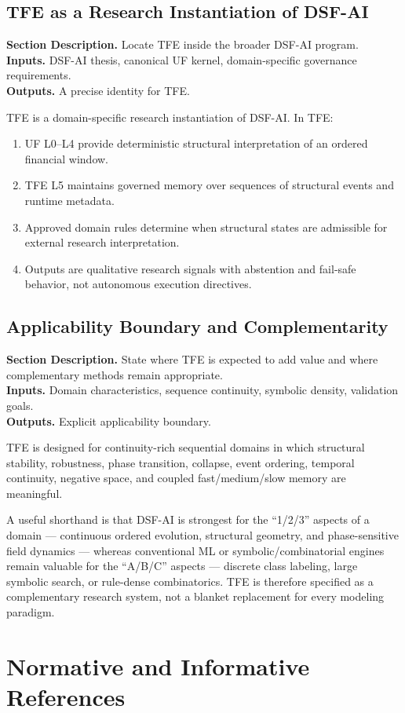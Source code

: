 \documentclass[11pt]{report}
\newcommand{\meta}[3]{\textbf{Section Description.} #1\\
\textbf{Inputs.} #2\\
\textbf{Outputs.} #3\par}
\begin{document}
\section{TFE as a Research Instantiation of DSF-AI}
\meta{Locate TFE inside the broader DSF-AI program.}{DSF-AI thesis, canonical UF kernel, domain-specific governance requirements.}{A precise identity for TFE.}

TFE is a domain-specific research instantiation of DSF-AI. In TFE:
\begin{enumerate}[leftmargin=1.2cm]
    \item UF L0--L4 provide deterministic structural interpretation of an ordered financial window.
    \item TFE L5 maintains governed memory over sequences of structural events and runtime metadata.
    \item Approved domain rules determine when structural states are admissible for external research interpretation.
    \item Outputs are qualitative research signals with abstention and fail-safe behavior, not autonomous execution directives.
\end{enumerate}

\section{Applicability Boundary and Complementarity}
\meta{State where TFE is expected to add value and where complementary methods remain appropriate.}{Domain characteristics, sequence continuity, symbolic density, validation goals.}{Explicit applicability boundary.}

TFE is designed for continuity-rich sequential domains in which structural stability, robustness, phase transition, collapse, event ordering, temporal continuity, negative space, and coupled fast/medium/slow memory are meaningful.

A useful shorthand is that DSF-AI is strongest for the ``1/2/3'' aspects of a domain --- continuous ordered evolution, structural geometry, and phase-sensitive field dynamics --- whereas conventional ML or symbolic/combinatorial engines remain valuable for the ``A/B/C'' aspects --- discrete class labeling, large symbolic search, or rule-dense combinatorics. TFE is therefore specified as a complementary research system, not a blanket replacement for every modeling paradigm.

\chapter{Normative and Informative References}
\end{document}
